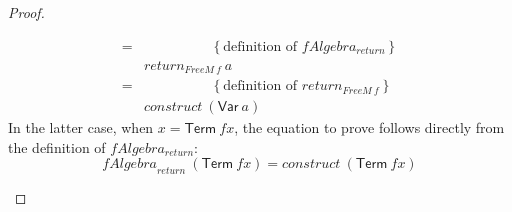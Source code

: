 \documentclass{jfp1}
\newcommand{\eqAnnotation}[1]{\hspace{2cm}\left\{\textrm{#1}\right\}}
\begin{document}
\begin{proof}
\begin{enumerate}
\begin{displaymath}
\begin{array}{cl}
        =&\eqAnnotation{definition of $\mathit{fAlgebra_{return}}$} \\
        & \mathit{return}_{\mathit{FreeM}~f}~a \\
        =&\eqAnnotation{definition of $\mathit{return}_{\mathit{FreeM}~f}$} \\
        & \mathit{construct}~(\mathsf{Var}~a)
      \end{array}
    \end{displaymath}
    In the latter case, when $x = \mathsf{Term}~\mathit{fx}$, the
    equation to prove follows directly from the definition of
    $\mathit{fAlgebra_{return}}$:
    \begin{displaymath}
      \mathit{fAlgebra}_{\mathit{return}}~(\mathsf{Term}~\mathit{fx}) = \mathit{construct}~(\mathsf{Term}~\mathit{fx})
    \end{displaymath}


\end{enumerate}
\end{proof}
\end{document}
